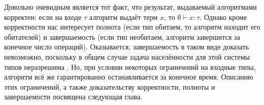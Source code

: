 \documentclass[../main.tex]{subfiles}
\begin{document}
Довольно очевидным является тот факт, что результат, выдаваемый алгоритмами корректен: если на входе $\tau$ алгоритм выдаёт терм $x$, то $\emptyset \vdash x \colon \tau$. Однако кроме корректности нас интересует полнота (если тип обитаем, то алгоритм находит его обитателей) и завершаемость (если тип необитаем, алгоритм завершится за конечное число операций). Оказывается, завершаемость в таком виде доказать невозможно, поскольку в общем случае задача населённости для этой системы типов неразрешима \cite{urzyczyn_1999}. Но, при условии некоторых ограничений на входные типы, алгоритм всё же гарантированно останавливается за конечное время. Описанию этих ограничений, а также доказательству корректности, полноты и завершаемости посвящена следующая глава.
\end{document}
